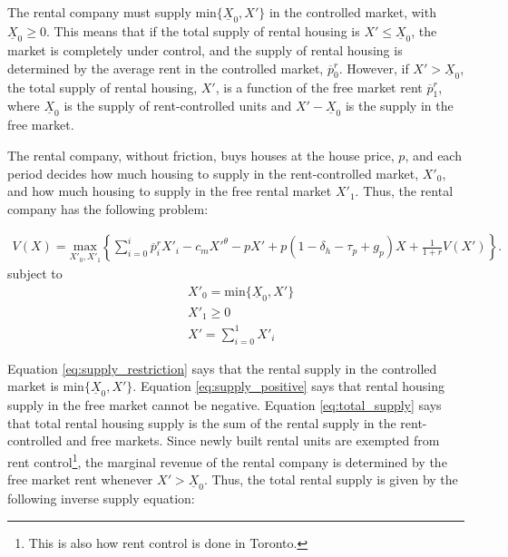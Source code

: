 \documentclass[parskip=full]{article}
\begin{document}
The rental company must supply $\mbox{min}\{\underline{X}_{0},X'\}$ in the controlled market, with $\underline{X}_{0} \geq 0$. This means that if the total supply of rental housing is $X'\leq \underline{X}_{0}$, the market is completely under control, and the supply of rental housing is determined by the average rent in the controlled market, $\overline{p}^{r}_{0}$. However, if $X'>\underline{X}_{0}$, the total supply of rental housing, $X'$, is a function of the free market rent $\overline{p}^{r}_{1}$, where $\underline{X}_{0}$ is the supply of rent-controlled units and $X'-\underline{X}_{0}$ is the supply in the free market.

The rental company, without friction, buys houses at the house price, $p$, and each period decides how much housing to supply in the rent-controlled market, $X'_{0}$, and how much housing to supply in the free rental market $X'_{1}$. Thus, the rental company has the following problem:


\begin{align}\label{eq:rental_company_problem}
V(X)=\underset{X'_{0},X'_{1}} {\text{$\mbox{max} $}}\left\{\sum_{i=0}^{i} \overline{p}^{r}_{i}X'_{i}-c_{m}X'^{\theta}-p X'+p(1-\delta_{h}-\tau_{p}+g_{p})X+\frac{1}{1+r}V(X')\right\}.
\end{align}
subject to
\begin{align}
& X'_{0}=\mbox{min}\{\underline{X}_{0},X'\} \label{eq:supply_restriction} \\
& X'_{1} \geq 0 \label{eq:supply_positive} \\
& X'=\sum^{1}_{i=0} X'_{i} \label{eq:total_supply} 
\end{align}

\noindent Equation \ref{eq:supply_restriction} says that the rental supply in the controlled market is $\mbox{min}\{\underline{X}_{0},X'\}$. Equation \ref{eq:supply_positive} says that rental housing supply in the free market cannot be negative. Equation \ref{eq:total_supply} says that total rental housing supply is the sum of the rental supply in the rent-controlled and free markets. Since newly built rental units are exempted from rent control\footnote{This is also how rent control is done in Toronto.}, the marginal revenue of the rental company is determined by the free market rent whenever $X'>\underline{X}_{0}$. Thus, the total rental supply is given by the following inverse supply equation:
\end{document}
